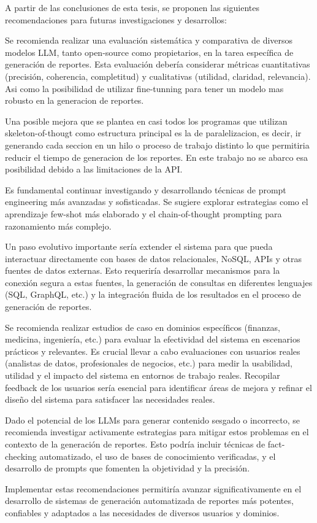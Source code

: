 \begin{recomendations}
    A partir de las conclusiones de esta tesis, se proponen las siguientes recomendaciones para futuras investigaciones y desarrollos:
    
    Se recomienda realizar una evaluación sistemática y comparativa de diversos modelos LLM, tanto open-source como propietarios, en la tarea específica de generación de reportes. Esta evaluación debería considerar métricas cuantitativas (precisión, coherencia, completitud) y cualitativas (utilidad, claridad, relevancia). Asi como la posibilidad de utilizar fine-tunning para tener un modelo mas robusto en la generacion de reportes.
    
    Una posible mejora que se plantea en casi todos los programas que  utilizan skeleton-of-thougt como estructura principal es la de paralelizacion, es decir, ir generando cada seccion en un hilo o proceso de trabajo distinto lo que permitiria reducir el tiempo de generacion de los reportes. En este trabajo no se abarco esa posibilidad debido a las limitaciones de la API.
    
    Es fundamental continuar investigando y desarrollando técnicas de prompt engineering más avanzadas y sofisticadas. Se sugiere explorar estrategias como el aprendizaje few-shot más elaborado y el chain-of-thought prompting para razonamiento más complejo.

    Un paso evolutivo importante sería extender el sistema para que pueda interactuar directamente con bases de datos relacionales, NoSQL, APIs y otras fuentes de datos externas. Esto requeriría desarrollar mecanismos para la conexión segura a estas fuentes, la generación de consultas en diferentes lenguajes (SQL, GraphQL, etc.) y la integración fluida de los resultados en el proceso de generación de reportes.
    
    Se recomienda realizar estudios de caso en dominios específicos (finanzas, medicina, ingeniería, etc.) para evaluar la efectividad del sistema en escenarios prácticos y relevantes. Es crucial llevar a cabo evaluaciones con usuarios reales (analistas de datos, profesionales de negocios, etc.) para medir la usabilidad, utilidad y el impacto del sistema en entornos de trabajo reales. Recopilar feedback de los usuarios sería esencial para identificar áreas de mejora y refinar el diseño del sistema para satisfacer las necesidades reales.
    
    Dado el potencial de los LLMs para generar contenido sesgado o incorrecto, se recomienda investigar activamente estrategias para mitigar estos problemas en el contexto de la generación de reportes. Esto podría incluir técnicas de fact-checking automatizado, el uso de bases de conocimiento verificadas, y el desarrollo de prompts que fomenten la objetividad y la precisión.
    
    Implementar estas recomendaciones permitiría avanzar significativamente en el desarrollo de sistemas de generación automatizada de reportes más potentes, confiables y adaptados a las necesidades de diversos usuarios y dominios.
\end{recomendations}
